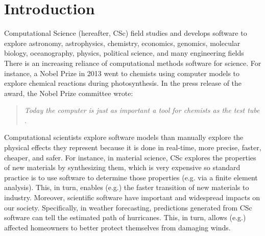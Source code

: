 \documentclass[conference,10pt]{IEEEtran}
\begin{document}
%
%
\section{Introduction}
  

Computational Science (hereafter, CSc)
field studies and develops software   to explore
 astronomy, astrophysics, chemistry, economics, genomics, molecular biology, oceanography, physics, political science,  and many   engineering fields 
There is an increasing reliance of computational methods software for science. For instance, a Nobel Prize in 2013 went to chemists using computer models to explore chemical reactions during photosynthesis. In the press release of the award, the Nobel Prize committee wrote:

\begin{quote}
{\em Today the computer is just as important a tool for chemists as the test tube \cite{nobel_2013}.}
\end{quote}


Computational scientists explore software models than manually explore the physical effects they represent because it is done in real-time, more precise, faster, cheaper, and safer.  For instance, in material science, CSc explores the properties
of new materials by synthesizing them, which is very expensive so standard practice is to use software to determine
those properties (e.g. via a finite element analysis). This, in turn, enables (e.g.) the faster transition of new materials to industry. Moreover, scientific software have important and widespread impacts on our society. Specifically, in weather forecasting, predictions generated from CSc
software can tell the estimated path of hurricanes. This, in turn,
allows (e.g.) affected homeowners to better protect themselves from
damaging winds. 

\end{document}
